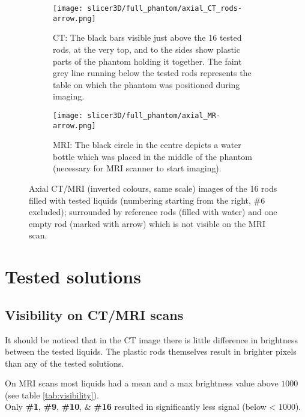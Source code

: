 \begin{figure}[!tbp]
  \begin{subfigure}[b]{\textwidth}
    \texttt{[image: slicer3D/full\_phantom/axial\_CT\_rods-arrow.png]}
    \caption{CT: The black bars visible just above the 16 tested rods, at the very top, and to the sides show plastic parts of the phantom holding it together. The faint grey line running below the tested rods represents the table on which the phantom was positioned during imaging.}
    \label{fig:axial_CT_rods}
  \end{subfigure}
  \begin{subfigure}[b]{\textwidth}
    \texttt{[image: slicer3D/full\_phantom/axial\_MR-arrow.png]}
    \caption{MRI: The black circle in the centre depicts a water bottle which was placed in the middle of the phantom (necessary for MRI scanner to start imaging).}
    \label{fig:axial_MR}
  \end{subfigure}
  \caption[Axial images of rods filled with tested liquids.]{Axial CT/MRI (inverted colours, same scale) images of the 16 rods filled with tested liquids (numbering starting from the right, \#6 excluded); surrounded by reference rods (filled with water) and one empty rod (marked with arrow) which is not visible on the MRI scan.}
  \label{fig:axial}
\end{figure}


\section{Tested solutions}

\subsection{Visibility on CT/MRI scans}

It should be noticed that in the CT image there is little difference in brightness between the tested liquids.
The plastic rods themselves result in brighter pixels than any of the tested solutions.

On MRI scans most liquids had a mean and a max brightness value above $1000$ (see table \ref{tab:visibility}).\\
Only \textbf{\#1}, \textbf{\#9}, \textbf{\#10}, \& \textbf{\#16} resulted in significantly less signal (below < $1000$).


